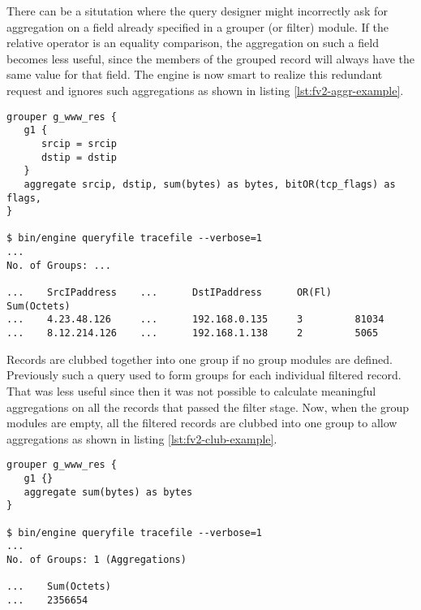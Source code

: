There can be a situtation where the query designer might incorrectly ask
for aggregation on a field already specified in a grouper (or filter)
module. If  the
relative operator is an equality comparison, the aggregation on such a
field becomes less useful, since the members of the grouped record will
always have the same value for that field. The engine is now smart to
realize this redundant request and ignores such aggregations as shown in
listing \ref{lst:fv2-aggr-example}.

\begin{lstlisting}
grouper g_www_res {
   g1 {
      srcip = srcip
      dstip = dstip
   }
   aggregate srcip, dstip, sum(bytes) as bytes, bitOR(tcp_flags) as flags,
}

$ bin/engine queryfile tracefile --verbose=1
...
No. of Groups: ...

...    SrcIPaddress    ...      DstIPaddress      OR(Fl)    Sum(Octets)
...    4.23.48.126     ...      192.168.0.135     3         81034
...    8.12.214.126    ...      192.168.1.138     2         5065
\end{lstlisting}

Records are clubbed together into one group if no group modules are defined.
Previously such a query used to form groups for each individual filtered
record.  That was less
useful since then it was not possible to calculate meaningful aggregations on
all the records that passed the filter stage. Now, when the group modules are
empty, all the filtered records are clubbed into one group to allow
aggregations as shown in listing \ref{lst:fv2-club-example}.

\begin{lstlisting}
grouper g_www_res {
   g1 {}
   aggregate sum(bytes) as bytes
}

$ bin/engine queryfile tracefile --verbose=1
...
No. of Groups: 1 (Aggregations)

...    Sum(Octets)
...    2356654
\end{lstlisting}

